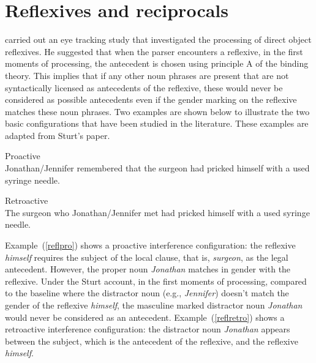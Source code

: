 \documentclass{cambridge7A}\usepackage[]{graphicx}\usepackage[]{color}
\begin{document}
\section{Reflexives and reciprocals}

\cite{Sturt2003} carried out an eye tracking study that investigated the processing of direct object reflexives. He suggested that when the parser encounters a  reflexive,  in the first moments of processing, the antecedent is chosen using principle A of the binding theory.   
 This implies that if any other noun phrases are present that are not syntactically licensed as antecedents of the reflexive, these would never be considered as possible antecedents even if the gender marking on the reflexive matches these noun phrases. Two examples are shown below  to illustrate  the two basic configurations that have been studied in the literature. These examples are adapted from Sturt's paper.
 
\begin{exe} 
\ex
\begin{xlist}
\item Proactive \label{reflpro}\\
Jonathan/Jennifer remembered that the surgeon had pricked himself with a used syringe needle.
  \item Retroactive \label{reflretro}\\
  The surgeon  who Jonathan/Jennifer  met had pricked himself with a used syringe needle.
\end{xlist}
\end{exe}
 
Example~(\ref{reflpro}) shows a  proactive interference configuration: the reflexive \textit{himself} requires the subject of the local clause, that is, \textit{surgeon}, as the legal antecedent. However, the proper noun \textit{Jonathan} matches in gender with the reflexive. Under the Sturt account, in the first moments of processing, compared to the baseline where the distractor noun (e.g., \textit{Jennifer}) doesn't match the gender of the reflexive \textit{himself}, the masculine marked distractor noun \textit{Jonathan} would never be considered as an antecedent. 
Example~(\ref{reflretro}) shows a  retroactive interference configuration:  the distractor noun \textit{Jonathan} appears between the subject, which is the antecedent of the reflexive, and the reflexive \textit{himself}. 
\end{document}
